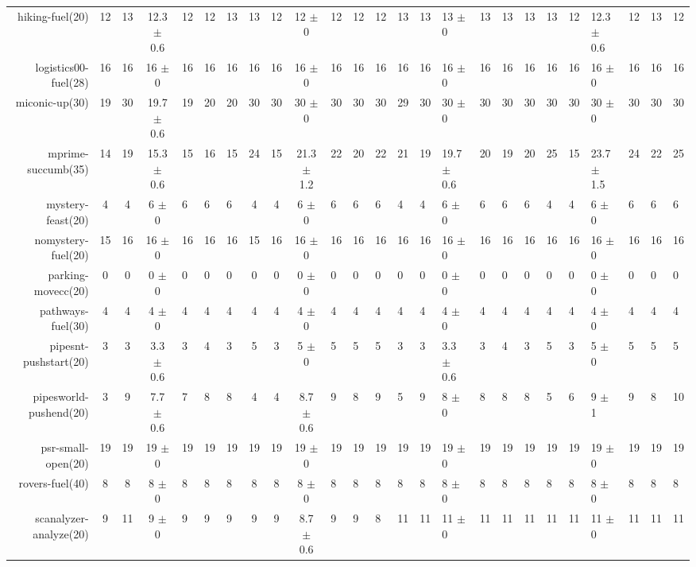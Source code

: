 \begin{center}
\begin{tabular}{|r|cccHHH|cccHHHHHHHHHHHHHHH|}
hiking-fuel(20) & 12 & 13 & 12.3 $\pm$ 0.6 & 12 & 12 & 13 & 13 & 12 & 12 $\pm$ 0 & 12 & 12 & 12 & 13 & 13 & 13 $\pm$ 0 & 13 & 13 & 13 & 13 & 12 & 12.3 $\pm$ 0.6 & 12 & 13 & 12\\
logistics00-fuel(28) & 16 & 16 & 16 $\pm$ 0 & 16 & 16 & 16 & 16 & 16 & 16 $\pm$ 0 & 16 & 16 & 16 & 16 & 16 & 16 $\pm$ 0 & 16 & 16 & 16 & 16 & 16 & 16 $\pm$ 0 & 16 & 16 & 16\\
miconic-up(30) & 19 & 30 & 19.7 $\pm$ 0.6 & 19 & 20 & 20 & 30 & 30 & 30 $\pm$ 0 & 30 & 30 & 30 & 29 & 30 & 30 $\pm$ 0 & 30 & 30 & 30 & 30 & 30 & 30 $\pm$ 0 & 30 & 30 & 30\\
mprime-succumb(35) & 14 & 19 & 15.3 $\pm$ 0.6 & 15 & 16 & 15 & 24 & 15 & 21.3 $\pm$ 1.2 & 22 & 20 & 22 & 21 & 19 & 19.7 $\pm$ 0.6 & 20 & 19 & 20 & 25 & 15 & 23.7 $\pm$ 1.5 & 24 & 22 & 25\\
mystery-feast(20) & 4 & 4 & 6 $\pm$ 0 & 6 & 6 & 6 & 4 & 4 & 6 $\pm$ 0 & 6 & 6 & 6 & 4 & 4 & 6 $\pm$ 0 & 6 & 6 & 6 & 4 & 4 & 6 $\pm$ 0 & 6 & 6 & 6\\
nomystery-fuel(20) & 15 & 16 & 16 $\pm$ 0 & 16 & 16 & 16 & 15 & 16 & 16 $\pm$ 0 & 16 & 16 & 16 & 16 & 16 & 16 $\pm$ 0 & 16 & 16 & 16 & 16 & 16 & 16 $\pm$ 0 & 16 & 16 & 16\\
parking-movecc(20) & 0 & 0 & 0 $\pm$ 0 & 0 & 0 & 0 & 0 & 0 & 0 $\pm$ 0 & 0 & 0 & 0 & 0 & 0 & 0 $\pm$ 0 & 0 & 0 & 0 & 0 & 0 & 0 $\pm$ 0 & 0 & 0 & 0\\
pathways-fuel(30) & 4 & 4 & 4 $\pm$ 0 & 4 & 4 & 4 & 4 & 4 & 4 $\pm$ 0 & 4 & 4 & 4 & 4 & 4 & 4 $\pm$ 0 & 4 & 4 & 4 & 4 & 4 & 4 $\pm$ 0 & 4 & 4 & 4\\
pipesnt-pushstart(20) & 3 & 3 & 3.3 $\pm$ 0.6 & 3 & 4 & 3 & 5 & 3 & 5 $\pm$ 0 & 5 & 5 & 5 & 3 & 3 & 3.3 $\pm$ 0.6 & 3 & 4 & 3 & 5 & 3 & 5 $\pm$ 0 & 5 & 5 & 5\\
pipesworld-pushend(20) & 3 & 9 & 7.7 $\pm$ 0.6 & 7 & 8 & 8 & 4 & 4 & 8.7 $\pm$ 0.6 & 9 & 8 & 9 & 5 & 9 & 8 $\pm$ 0 & 8 & 8 & 8 & 5 & 6 & 9 $\pm$ 1 & 9 & 8 & 10\\
psr-small-open(20) & 19 & 19 & 19 $\pm$ 0 & 19 & 19 & 19 & 19 & 19 & 19 $\pm$ 0 & 19 & 19 & 19 & 19 & 19 & 19 $\pm$ 0 & 19 & 19 & 19 & 19 & 19 & 19 $\pm$ 0 & 19 & 19 & 19\\
rovers-fuel(40) & 8 & 8 & 8 $\pm$ 0 & 8 & 8 & 8 & 8 & 8 & 8 $\pm$ 0 & 8 & 8 & 8 & 8 & 8 & 8 $\pm$ 0 & 8 & 8 & 8 & 8 & 8 & 8 $\pm$ 0 & 8 & 8 & 8\\
scanalyzer-analyze(20) & 9 & 11 & 9 $\pm$ 0 & 9 & 9 & 9 & 9 & 9 & 8.7 $\pm$ 0.6 & 9 & 9 & 8 & 11 & 11 & 11 $\pm$ 0 & 11 & 11 & 11 & 11 & 11 & 11 $\pm$ 0 & 11 & 11 & 11\\

\end{tabular}
\end{center}

